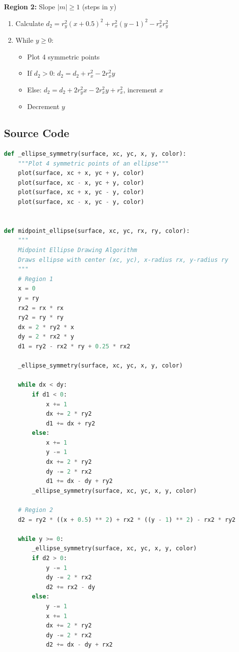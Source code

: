 \documentclass[12pt,a4paper]{article}
\begin{document}
\textbf{Region 2:} Slope $|m| \geq 1$ (steps in y)
\begin{enumerate}
    \item Calculate $d_2 = r_y^2(x + 0.5)^2 + r_x^2(y - 1)^2 - r_x^2 r_y^2$
    \item While $y \geq 0$:
    \begin{itemize}
        \item Plot 4 symmetric points
        \item If $d_2 > 0$: $d_2 = d_2 + r_x^2 - 2 r_x^2 y$
        \item Else: $d_2 = d_2 + 2 r_y^2 x - 2 r_x^2 y + r_x^2$, increment $x$
        \item Decrement $y$
    \end{itemize}
\end{enumerate}

\subsection{Source Code}
\begin{lstlisting}[language=Python, caption=Midpoint Ellipse Drawing Algorithm]
def _ellipse_symmetry(surface, xc, yc, x, y, color):
    """Plot 4 symmetric points of an ellipse"""
    plot(surface, xc + x, yc + y, color)
    plot(surface, xc - x, yc + y, color)
    plot(surface, xc + x, yc - y, color)
    plot(surface, xc - x, yc - y, color)


def midpoint_ellipse(surface, xc, yc, rx, ry, color):
    """
    Midpoint Ellipse Drawing Algorithm
    Draws ellipse with center (xc, yc), x-radius rx, y-radius ry
    """
    # Region 1
    x = 0
    y = ry
    rx2 = rx * rx
    ry2 = ry * ry
    dx = 2 * ry2 * x
    dy = 2 * rx2 * y
    d1 = ry2 - rx2 * ry + 0.25 * rx2
    
    _ellipse_symmetry(surface, xc, yc, x, y, color)
    
    while dx < dy:
        if d1 < 0:
            x += 1
            dx += 2 * ry2
            d1 += dx + ry2
        else:
            x += 1
            y -= 1
            dx += 2 * ry2
            dy -= 2 * rx2
            d1 += dx - dy + ry2
        _ellipse_symmetry(surface, xc, yc, x, y, color)

    # Region 2
    d2 = ry2 * ((x + 0.5) ** 2) + rx2 * ((y - 1) ** 2) - rx2 * ry2
    
    while y >= 0:
        _ellipse_symmetry(surface, xc, yc, x, y, color)
        if d2 > 0:
            y -= 1
            dy -= 2 * rx2
            d2 += rx2 - dy
        else:
            y -= 1
            x += 1
            dx += 2 * ry2
            dy -= 2 * rx2
            d2 += dx - dy + rx2
\end{lstlisting}
\end{document}
